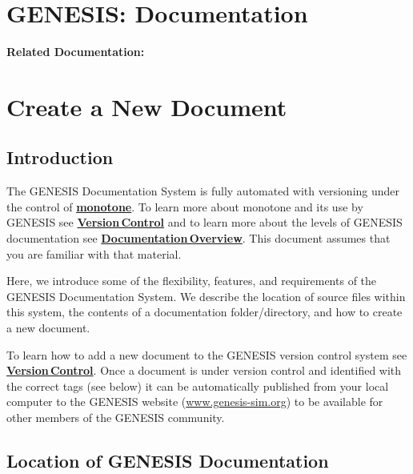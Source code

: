 \documentclass[12pt]{article}
\begin{document}
\section*{GENESIS: Documentation}

{\bf Related Documentation:}

\section*{Create a New Document}

\subsection*{Introduction}

The GENESIS Documentation System is fully automated with versioning under the control of \href{http://monotone.ca/}{\bf monotone}. To learn more about monotone and its use by GENESIS see \href{../version-control/version-control.tex}{\bf Version\,Control} and to learn more about the levels of GENESIS documentation see \href{../documentation-overview/documentation-overview.tex}{\bf Documentation\,Overview}. This document assumes that you are familiar with that material.

Here, we introduce some of the flexibility, features, and requirements of the GENESIS Documentation System. We describe the location of source files within this system, the contents of a documentation folder/directory, and how to create a new document.

To learn how to add a new document to the GENESIS version control system see \href{../version-control/version-control.tex}{\bf Version\,Control}. Once a document is under version control and identified with the correct tags (see below) it can be automatically published from your local computer to the GENESIS website (\href{http://www.genesis-sim.org/}{www.genesis-sim.org}) to be available for other members of the GENESIS community.

\subsection*{Location of GENESIS Documentation}
\end{document}
